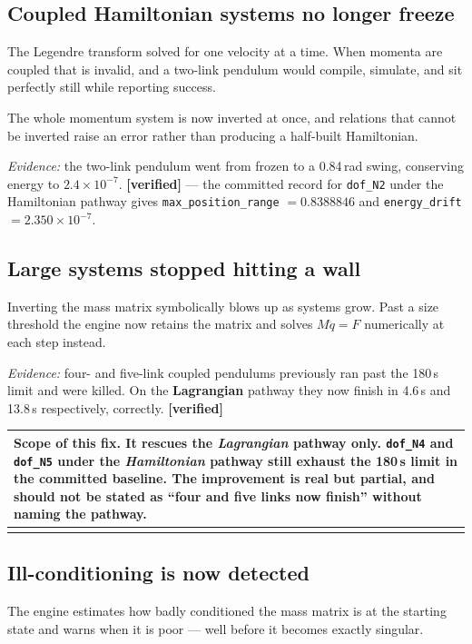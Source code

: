 \documentclass[11pt,a4paper]{article}
\makeatletter
\newenvironment{callout}
  {\par\medskip\noindent\begin{tabular}{@{}p{0.94\textwidth}@{}}
   \arrayrulecolor{warnrule}\hline\rule{0pt}{2.6ex}}
  {\\[0.8ex]\hline\arrayrulecolor{black}\end{tabular}\par\medskip}
\newcommand{\evidence}[1]{\emph{Evidence:} #1}
\newcommand{\vconf}{\textcolor{okgreen}{\textbf{[verified]}}}
\makeatother
\begin{document}
\subsection{Coupled Hamiltonian systems no longer freeze}

The Legendre transform solved for one velocity at a time. When momenta are
coupled that is invalid, and a two-link pendulum would compile, simulate, and
sit perfectly still while reporting success.

The whole momentum system is now inverted at once, and relations that cannot be
inverted raise an error rather than producing a half-built Hamiltonian.

\evidence{the two-link pendulum went from frozen to a 0.84\,rad swing,
conserving energy to $2.4\times10^{-7}$.} \vconf{} --- the committed record for
\texttt{dof\_N2} under the Hamiltonian pathway gives
\texttt{max\_position\_range} $= 0.8388846$ and \texttt{energy\_drift}
$= 2.350\times10^{-7}$.

\subsection{Large systems stopped hitting a wall}

Inverting the mass matrix symbolically blows up as systems grow. Past a size
threshold the engine now retains the matrix and solves $M\ddot{q} = F$
numerically at each step instead.

\evidence{four- and five-link coupled pendulums previously ran past the
180\,s limit and were killed. On the \textbf{Lagrangian} pathway they now
finish in 4.6\,s and 13.8\,s respectively, correctly.} \vconf{}

\begin{callout}
\textbf{Scope of this fix.} It rescues the \emph{Lagrangian} pathway only.
\texttt{dof\_N4} and \texttt{dof\_N5} under the \emph{Hamiltonian} pathway
still exhaust the 180\,s limit in the committed baseline. The improvement is
real but partial, and should not be stated as ``four and five links now
finish'' without naming the pathway.
\end{callout}

\subsection{Ill-conditioning is now detected}

The engine estimates how badly conditioned the mass matrix is at the starting
state and warns when it is poor --- well before it becomes exactly singular.
\end{document}
